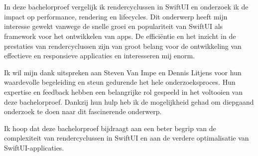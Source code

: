 
\chapter*{}%
\label{ch:voorwoord}


In deze bachelorproef vergelijk ik rendercyclussen in SwiftUI en onderzoek ik de impact op performance, rendering en lifecycles. Dit onderwerp heeft mijn interesse gewekt vanwege de snelle groei en populariteit van SwiftUI als framework voor het ontwikkelen van apps. De efficiëntie en het inzicht in de prestaties van rendercyclussen zijn van groot belang voor de ontwikkeling van effectieve en responsieve applicaties en interesseren mij enorm.

Ik wil mijn dank uitspreken aan Steven Van Impe en Dennis Litjens voor hun waardevolle begeleiding en steun gedurende het hele onderzoeksproces. Hun expertise en feedback hebben een belangrijke rol gespeeld in het voltooien van deze bachelorproef. Dankzij hun hulp heb ik de mogelijkheid gehad om diepgaand onderzoek te doen naar dit fascinerende onderwerp.

Ik hoop dat deze bachelorproef bijdraagt aan een beter begrip van de complexiteit van rendercyclussen in SwiftUI en aan de verdere optimalisatie van SwiftUI-applicaties.